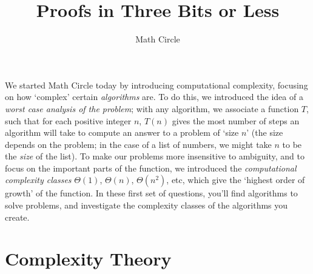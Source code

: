 \documentclass[answers]{exam}
\title{Proofs in Three Bits or Less}
\author{Math Circle}
\begin{document}
\maketitle

We started Math Circle today by introducing computational complexity, focusing on how `complex' certain \emph{algorithms} are. To do this, we introduced the idea of a \emph{worst case analysis of the problem}; with any algorithm, we associate a function $T$, such that for each positive integer $n$, $T(n)$ gives the most number of steps an algorithm will take to compute an answer to a problem of `size $n$' (the size depends on the problem; in the case of a list of numbers, we might take $n$ to be the \emph{size} of the list). To make our problems more insensitive to ambiguity, and to focus on the important parts of the function, we introduced the \emph{computational complexity classes} $\Theta(1)$, $\Theta(n)$, $\Theta(n^2)$, etc, which give the `highest order of growth' of the function. In these first set of questions, you'll find algorithms to solve problems, and investigate the complexity classes of the algorithms you create.

\section{Complexity Theory}
\end{document}
